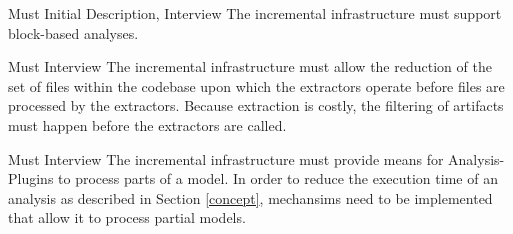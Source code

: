 \documentclass[a4paper]{article}
\begin{document}
\begin{req}\label{req:analysis-types}
	\reqtable
	{Must}  {Initial Description, Interview}
	{The incremental infrastructure must support block-based analyses. }
	{}
	
\end{req}


\begin{req} \label{req:early-filtering}
\reqtable
	{Must}  {Interview}
	{The incremental infrastructure must allow the reduction of the set of files within the codebase upon which the extractors operate before files are processed by the extractors.}
	{Because extraction is costly, the filtering of artifacts must happen before the extractors are called.}
\end{req}

\begin{req} \label{req:partial-models}
\reqtable
	{Must}  {Interview}
	{The incremental infrastructure must provide means for Analysis-Plugins to process parts of a model.}
	{In order to reduce the execution time of an analysis as described in Section \ref{concept}, mechansims need to be implemented that allow it to process partial models.}
\end{req}
\end{document}
